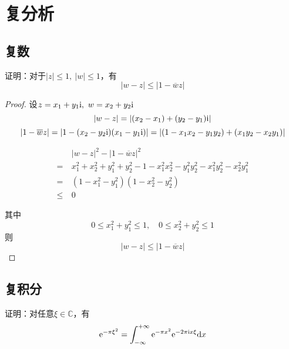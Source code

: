 \chapter{复分析}

\section{复数}

\begin{proposition}
    
    证明：对于$|z| \leq 1, \ |w| \leq 1$，有
    $$|w - z| \leq |1 - \overline{w}z|$$

\end{proposition}

\begin{proof}

    设$z = x_1 + y_1\mathrm{i},\ w = x_2 + y_2\mathrm{i}$
    $$|w - z| = | (x_2 - x_1) + (y_2 - y_1)\mathrm{i}| $$
    $$|1 - \overline{w}z| = |1 - (x_2 - y_2\mathrm{i}) (x_1 - y_1\mathrm{i})| = | (1 - x_1x_2 - y_1y_2) + (x_1y_2 - x_2y_1) |$$

    \begin{align*}
        &|w - z|^2 - |1 - \overline{w}z|^2 \\
        = \ & x_1^2 + x_2^2 + y_1^2 + y_2^2 - 1 - x_1^2x_2^2 -  y_1^2y_2^2 - x_1^2 y_2^2 -  x_2^2y_1^2 \\
        = \ & (1 - x_1^2 - y_1^2) (1 - x_2^2 - y_2^2) \\
        \leq \ & 0
    \end{align*}

    其中
    $$0 \leq x_1^2 + y_1^2 \leq 1, \quad 0 \leq x_2^2 + y_2^2 \leq 1$$
    则
    $$|w - z| \leq |1 - \overline{w}z|$$

\end{proof}

\section{复积分}

\begin{proposition}

    证明：对任意$ \xi \in \mathbb{C}$，有
    $$\mathrm{e}^{-\pi\xi^2} = \int_{-\infty}^{+\infty}{\mathrm{e}^{-\pi x^2}\mathrm{e}^{-2\pi \mathrm{i} x\xi}}\mathrm{d} x$$
    
\end{proposition}

